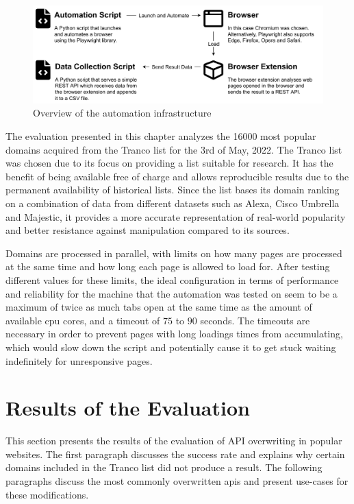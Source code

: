 \begin{figure}[H]
    \centering
    \includegraphics[width=16cm]{img/automation.pdf}
    \caption{Overview of the automation infrastructure}
    \label{fig.automation}
\end{figure}

\filbreak{}

The evaluation presented in this chapter analyzes the \num[round-precision=0]{16000} most popular domains acquired from the Tranco list \cite{Tranco} for the 3rd of May, 2022. The Tranco list was chosen due to its focus on providing a list suitable for research. It has the benefit of being available free of charge and allows reproducible results due to the permanent availability of historical lists. Since the list bases its domain ranking on a combination of data from different datasets such as Alexa, Cisco Umbrella and Majestic, it provides a more accurate representation of real-world popularity and better resistance against manipulation compared to its sources. \cite{Tranco}

Domains are processed in parallel, with limits on how many pages are processed at the same time and how long each page is allowed to load for. After testing different values for these limits, the ideal configuration in terms of performance and reliability for the machine that the automation was tested on seem to be a maximum of twice as much tabs open at the same time as the amount of available \acs{cpu} cores, and a timeout of $75$ to $90$ seconds. The timeouts are necessary in order to prevent pages with long loadings times from accumulating, which would slow down the script and potentially cause it to get stuck waiting indefinitely for unresponsive pages.



\section{Results of the Evaluation}
\label{sec.findings}

This section presents the results of the evaluation of API overwriting in popular websites. The first paragraph discusses the success rate and explains why certain domains included in the Tranco list did not produce a result. The following paragraphs discuss the most commonly overwritten \acsp{api} and present use-cases for these modifications.

